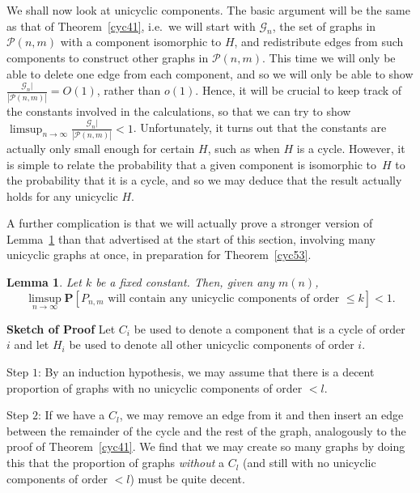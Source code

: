 \documentclass{article}
\newtheorem{Lemma}[Theorem]{Lemma}
\newtheorem{Proof of Theorem}{Proof of Theorem}
\begin{document}
We shall now look at unicyclic components.
The basic argument will be the same as that of Theorem~\ref{cyc41},
i.e.~we will start with $\mathcal{G}_{n}$,
the set of graphs in~$\mathcal{P}(n,m)$ with a component isomorphic to $H$,
and redistribute edges from such components to construct other graphs in $\mathcal{P}(n,m)$.
This time we will only be able to delete one edge from each component,
and so we will only be able to show
$\frac{\mathcal{G}_{n}|}{|\mathcal{P}(n,m)|} = O(1)$,
rather than $o(1)$.
Hence,
it will be crucial to keep track of the constants involved in the calculations,
so that we can try to show~$\limsup_{n \to \infty} \frac{\mathcal{G}_{n}|}{|\mathcal{P}(n,m)|} < 1$.
Unfortunately,
it turns out that the constants are actually only small enough for certain $H$,
such as when $H$ is a cycle.
However,
it is simple to relate the probability that a given component is isomorphic to~$H$ 
to the probability that it is a cycle,
and so we may deduce that the result actually holds for any unicyclic $H$.

A further complication is that we will actually prove a stronger version of Lemma~\ref{cyc52}
than that advertised at the start of this section,
involving many unicyclic graphs at once,
in preparation for Theorem~\ref{cyc53}. \\















\begin{Lemma} \label{cyc52}
Let $k$ be a fixed constant.
Then, given any $m(n)$,
\begin{displaymath}
\limsup_{n \to \infty}
\mathbf{P}[P_{n,m} \textrm{ will contain any unicyclic components of order } \leq k] < 1.
\end{displaymath}
\end{Lemma}
\textbf{Sketch of Proof}
Let $C_{i}$ be used to denote a component that is a cycle of order~$i$ 
and let $H_{i}$ be used to denote all other unicyclic components of order $i$. 

Step $1$: 
By an induction hypothesis, 
we may assume that there is a decent proportion of graphs with no unicyclic components of order $<l$.

Step $2$:
If we have a $C_{l}$,
we may remove an edge from it and then insert an edge
between the remainder of the cycle and the rest of the graph,
analogously to the proof of Theorem~\ref{cyc41}.
We find that we may create so many graphs by doing this
that the proportion of graphs \textit{without} a $C_{l}$ (and still with no unicyclic components of order $<l$)
must be quite decent.
\end{document}
